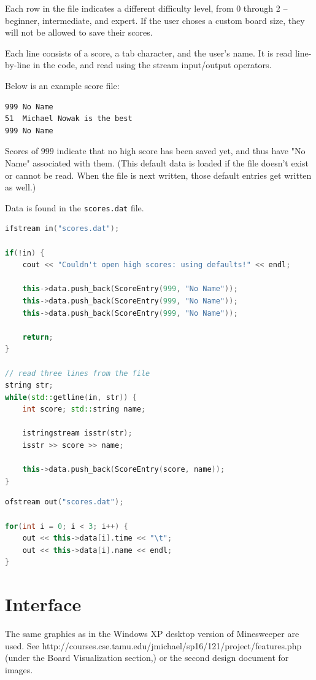 \documentclass[11pt]{article}
\begin{document}
Each row in the file indicates a different difficulty level, from 0 through 2 -- beginner, intermediate, and expert. If the user choses a custom board size, they will not be allowed to save their scores.

Each line consists of a score, a tab character, and the user's name. It is read line-by-line in the code, and read using the stream input/output operators.

Below is an example score file:

\begin{lstlisting}[frame=single]
999	No Name
51	Michael Nowak is the best
999	No Name
\end{lstlisting}

Scores of $999$ indicate that no high score has been saved yet, and thus have "No Name" associated with them. (This default data is loaded if the file doesn't exist or cannot be read. When the file is next written, those default entries get written as well.)

Data is found in the \texttt{scores.dat} file.

\begin{lstlisting}[frame=single,language=C++]
ifstream in("scores.dat");

if(!in) {
    cout << "Couldn't open high scores: using defaults!" << endl;

    this->data.push_back(ScoreEntry(999, "No Name"));
    this->data.push_back(ScoreEntry(999, "No Name"));
    this->data.push_back(ScoreEntry(999, "No Name"));

    return;
}

// read three lines from the file
string str;
while(std::getline(in, str)) {
    int score; std::string name;

    istringstream isstr(str);
    isstr >> score >> name;

    this->data.push_back(ScoreEntry(score, name));
}
\end{lstlisting}


\begin{lstlisting}[frame=single,language=C++]
ofstream out("scores.dat");

for(int i = 0; i < 3; i++) {
    out << this->data[i].time << "\t";
    out << this->data[i].name << endl;
}
\end{lstlisting}

\pagebreak
\section{Interface}
The same graphics as in the Windows XP desktop version of Minesweeper are used. See http://courses.cse.tamu.edu/jmichael/sp16/121/project/features.php (under the Board Visualization section,) or the second design document for images.
\end{document}
